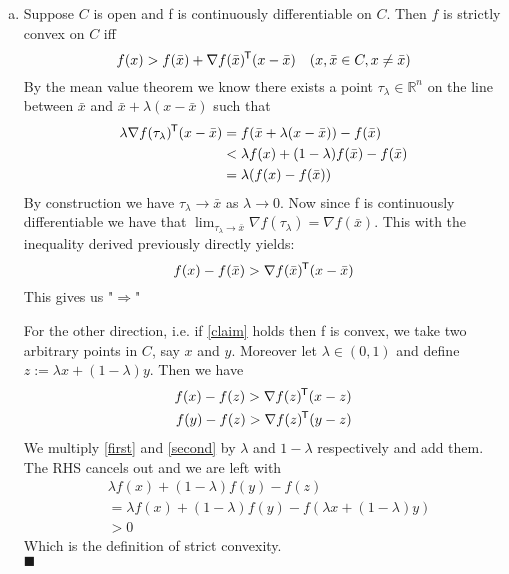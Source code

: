 \documentclass{article}
\newcommand*{\tran}{^{\mkern-1.5mu\mathsf{T}}}%
\begin{document}
\begin{enumerate}[(a)]
		\item Suppose $C$ is open and f is continuously differentiable on $C$. Then $f$ is strictly convex on $C$ iff
		\begin{equation}\label{claim}
			f(x) > f(\bar x) + \nabla f(\bar x) \tran (x-\bar x) \quad (x,\bar x \in C, x\neq \bar x)
		\end{equation}
		 By the mean value theorem we know there exists a point $\tau_\lambda \in \mathbb R^n$ on the line between $\bar x$ and $\bar x + \lambda (x- \bar x)$ such that
		\begin{align}
			\lambda \nabla f(\tau_\lambda )\tran (x - \bar x) &= f(\bar x + \lambda (x - \bar x))  - f(\bar x)\\
			&<\lambda f(x) + (1-\lambda)f(\bar x) - f(\bar x)\\
			&= \lambda(f(x) - f(\bar x))
		\end{align}
		By construction we have $\tau_\lambda \rightarrow \bar x$ as $\lambda \rightarrow 0$. Now since f is continuously differentiable we have that $\lim_{\tau_\lambda \rightarrow \bar x} \nabla f(\tau_\lambda) = \nabla f(\bar x)$. This with the inequality derived previously directly yields:
		\begin{equation}
			f(x) - f(\bar x) > \nabla f(\bar x) \tran (x-\bar x)
		\end{equation}
		This gives us "$\Rightarrow$"
		
		
		For the other direction, i.e. if \ref{claim} holds then f is convex, we take two arbitrary points in $C$, say $x$ and $y$. Moreover let $\lambda \in (0,1)$ and define $z := \lambda x+ (1-\lambda)y$. Then we have 
		\begin{align}
			f(x) - f(z) > \nabla f(z)\tran (x-z) \label{first} \\
			f(y) - f(z) > \nabla f(z)\tran (y-z) \label{second}
		\end{align}
		We multiply \ref{first} and \ref{second} by $\lambda$ and $1- \lambda$ respectively and add them. The RHS cancels out and we are left with
		\begin{align}
			&\lambda f(x) + (1-\lambda)f(y) - f(z) \\
			&= \lambda f(x) + (1-\lambda)f(y) - f( \lambda x+ (1-\lambda)y )\\
			&> 0  
		\end{align}
		Which is the definition of strict convexity.\\
		$\blacksquare$
	\end{enumerate}
	
	
	\clearpage
	
\end{document}
